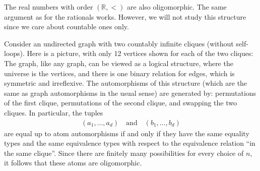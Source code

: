 \begin{myexample}
    The real numbers with order $(\mathbb R, <)$ are also oligomorphic. The same argument as for the rationals works. However, we will not study this structure since we care about countable ones only.
\end{myexample}



\begin{myexample}\label{ex:two-cliques}
	Consider an undirected graph with two countably infinite cliques (without self-loops). Here is a picture, with only 12 vertices shown for each of the two cliques:
	The graph, like any graph, can be viewed as a logical structure, where the universe is the vertices, and there is one binary relation for edges, which is symmetric and irreflexive. 
	The automorphisms of this structure (which are the same as graph automorphisms in the usual sense) are generated by: permutations of the first clique, permutations of the second clique, and swapping the two cliques. In particular, the tuples
	\begin{align*}
		(a_1,\ldots,a_d) \quad \text{and} \quad (b_1,\ldots,b_d)
	\end{align*} 
	are equal up to atom automorphisms if and only if they have the same equality types and the same equivalence types with respect to the equivalence relation ``in the same clique''. Since there are finitely many possibilities for every choice of $n$, it follows that these atoms are oligomorphic.
\end{myexample}

